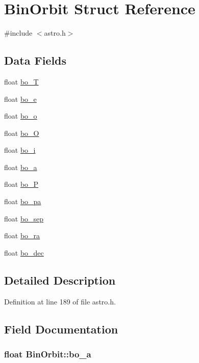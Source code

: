 \hypertarget{struct_bin_orbit}{\section{Bin\-Orbit Struct Reference}
\label{struct_bin_orbit}
}


{\ttfamily \#include $<$astro.\-h$>$}

\subsection*{Data Fields}
\begin{DoxyCompactItemize}
\item 
float \hyperlink{struct_bin_orbit_a13a14fdb480f7e64a11a574f6c3a4c74}{bo\-\_\-\-T}
\item 
float \hyperlink{struct_bin_orbit_a153e76ae7fbba6c5d51db5c849712fd7}{bo\-\_\-e}
\item 
float \hyperlink{struct_bin_orbit_a7ed2ce32869bece7d6f19ad4513c8ca1}{bo\-\_\-o}
\item 
float \hyperlink{struct_bin_orbit_a4b329066d26ceae03acbcaf73b2eee9c}{bo\-\_\-\-O}
\item 
float \hyperlink{struct_bin_orbit_ac352c440ca03b4fb61318b7af937a272}{bo\-\_\-i}
\item 
float \hyperlink{struct_bin_orbit_a678bd2f8ce272811bbda8eb371bc9199}{bo\-\_\-a}
\item 
float \hyperlink{struct_bin_orbit_ada0bcef01f07cd152cf994e004276b25}{bo\-\_\-\-P}
\item 
float \hyperlink{struct_bin_orbit_ad3fedf474fce6b3a979767b6e87bcf89}{bo\-\_\-pa}
\item 
float \hyperlink{struct_bin_orbit_afbdda06daa8e30a7737c039351262e99}{bo\-\_\-sep}
\item 
float \hyperlink{struct_bin_orbit_a1d4a15be4410fce37882ba20ba589af0}{bo\-\_\-ra}
\item 
float \hyperlink{struct_bin_orbit_adbdb17536ddf22681e9d3ec9aa140ee2}{bo\-\_\-dec}
\end{DoxyCompactItemize}


\subsection{Detailed Description}


Definition at line 189 of file astro.\-h.



\subsection{Field Documentation}
\hypertarget{struct_bin_orbit_a678bd2f8ce272811bbda8eb371bc9199}{
\subsubsection[{bo\-\_\-a}]{\setlength{\rightskip}{0pt plus 5cm}float Bin\-Orbit\-::bo\-\_\-a}}\label{struct_bin_orbit_a678bd2f8ce272811bbda8eb371bc9199}


